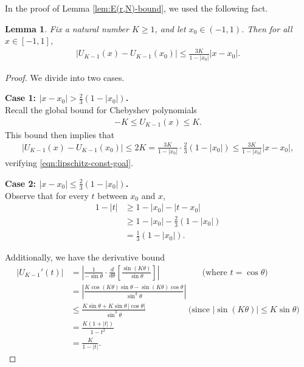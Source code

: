 \documentclass[12pt,letterpaper,reqno]{amsart}
\theoremstyle{plain}
\newtheorem{lemma}[theorem]{Lemma}
\theoremstyle{definition}
\numberwithin{equation}{section}
\numberwithin{figure}{section}
\numberwithin{table}{section}
\newcommand{\lrabs}[1]{\!\left\lvert #1 \right\lvert}
\newcommand{\lrb}[1]{\!\left[#1\right]}
\begin{document}
In the proof of Lemma \ref{lem:E(r,N)-bound}, we used the following fact.
\begin{lemma} \label{lem:lipschitz-const-at-x0-for-U}
    Fix a natural number $K \ge 1$, and let $x_0 \in (-1,1)$. Then for all $x \in [-1,1]$,
    \begin{align}
        \label{eqn:lipschitz-const-goal}
        |U_{K-1}(x) - U_{K-1}(x_0)| \le \frac{3K}{1-|x_0|} |x-x_0|.
    \end{align}
\end{lemma}
\begin{proof}
We divide into two cases.

\textbf{Case 1: $|x-x_0| > \frac{2}{3} (1-|x_0|)$. \\}
Recall the global bound for Chebyshev polynomials
\begin{align}
    -K \le U_{K-1}(x) \le K.
\end{align}
This bound then implies that
\begin{align}
    |U_{K-1}(x)-U_{K-1}(x_0)| \le 2K = \frac{3K}{1-|x_0|} \cdot \frac{2}{3} (1-|x_0|) \le \frac{3K}{1-|x_0|} |x-x_0|,
\end{align}
verifying \eqref{eqn:lipschitz-const-goal}.


\textbf{Case 2: $|x-x_0| \le \frac{2}{3} (1-|x_0|)$. \\}
Observe that for every $t$ between $x_0$ and $x$, 
\begin{align}
    1-|t|
    &\ge
    1-|x_0|-|t-x_0| \\
    &\ge
    1-|x_0|-\frac{2}{3}(1-|x_0|) \\
    &=
    \frac{1}{3}(1-|x_0|).
    \label{eq:xi-away-from-endpoint}
\end{align}


Additionally, we have the derivative bound
\begin{align}
    |U_{K-1}'(t)|
    &=
    \lrabs{
        \frac{1}{-\sin \theta}
        \cdot
        \frac{d}{d\theta}
        \lrb{
            \frac{\sin(K\theta)}{\sin \theta}
        }
    } \qquad \qquad\quad
    \text{(where $t=\cos \theta$)}
    \\
    &=
    \lrabs{
    \frac{
        K\cos(K\theta)\sin\theta
        -
        \sin(K\theta)\cos\theta
    }{\sin^3\theta}
    } \\
    &\le
    \frac{
        K\sin\theta
        +
        K\sin\theta\,|\cos\theta|
    }{\sin^3\theta}
    \qquad\qquad\quad
    \text{(since $|\sin(K\theta)|\le K\sin\theta$)}
    \\
    &=
    \frac{K(1+|t|)}{1-t^2} \\
    &=
    \frac{K}{1-|t|}.
    \label{eq:U-derivative-bound}
\end{align}




\end{proof}
\end{document}
